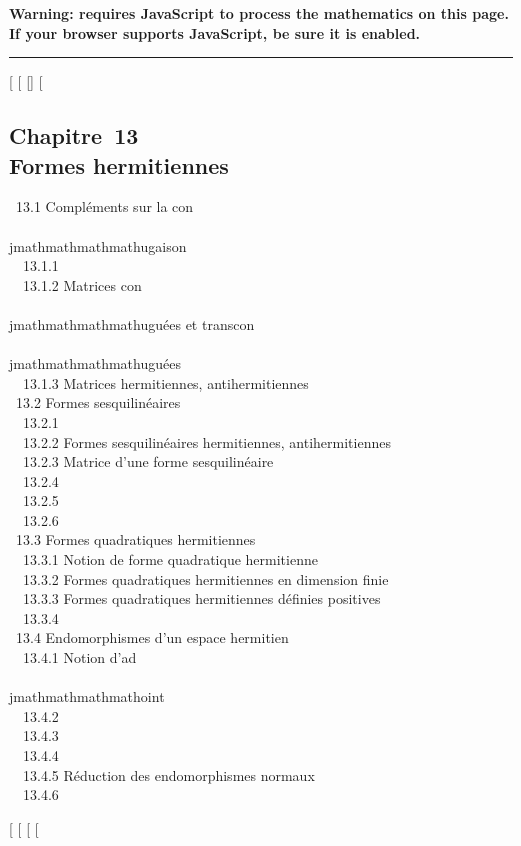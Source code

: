 \textbf{Warning: 
requires JavaScript to process the mathematics on this page.\\ If your
browser supports JavaScript, be sure it is enabled.}

\begin{center}\rule{3in}{0.4pt}\end{center}

{[}
{[}
{[}{]}
{[}

\subsection{Chapitre~13\\Formes hermitiennes}

~13.1 {Compléments sur la
con\\\\jmathmathmathmathugaison} \\ ~~13.1.1
 \\
~~13.1.2 {Matrices con\\\\jmathmathmathmathuguées et
transcon\\\\jmathmathmathmathuguées} \\ ~~13.1.3
{Matrices hermitiennes,
antihermitiennes} \\ ~13.2 {Formes
sesquilinéaires} \\ ~~13.2.1
 \\ ~~13.2.2
{Formes sesquilinéaires
hermitiennes, antihermitiennes} \\ ~~13.2.3
{Matrice d'une forme
sesquilinéaire} \\ ~~13.2.4
 \\
~~13.2.5  \\
~~13.2.6 
\\ ~13.3 {Formes quadratiques
hermitiennes} \\ ~~13.3.1 {Notion
de forme quadratique hermitienne} \\ ~~13.3.2
{Formes quadratiques hermitiennes
en dimension finie} \\ ~~13.3.3
{Formes quadratiques hermitiennes
définies positives} \\ ~~13.3.4
 \\ ~13.4
{Endomorphismes d'un espace
hermitien} \\ ~~13.4.1 {Notion
d'ad\\\\jmathmathmathmathoint} \\ ~~13.4.2
 \\
~~13.4.3  \\
~~13.4.4  \\
~~13.4.5 {Réduction des
endomorphismes normaux} \\ ~~13.4.6


{[}
{[}
{[}
{[}
